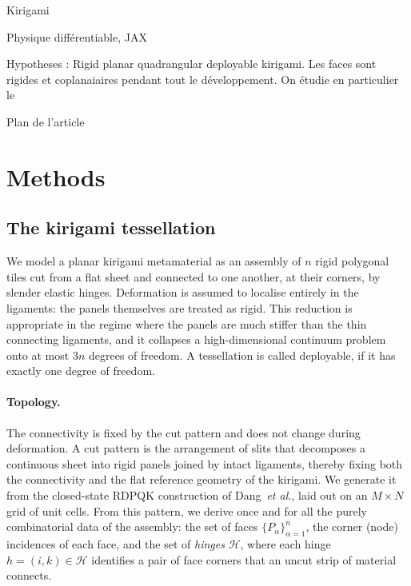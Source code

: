 \documentclass[pdflatex,sn-mathphys-num]{sn-jnl}%
\theoremstyle{thmstyleone}%
\theoremstyle{thmstyletwo}%
\theoremstyle{thmstylethree}%
\begin{document}
Kirigami

Physique différentiable, JAX

Hypotheses : 
Rigid planar quadrangular deployable kirigami. 
Les faces sont rigides et coplanaiaires pendant tout le développement. 
On étudie en particulier le 


Plan de l'article

\section{Methods}\label{secM}

\subsection{The kirigami tessellation}

We model a planar kirigami metamaterial as an assembly of $n$ rigid polygonal tiles cut from a flat sheet and connected to one another, at their corners, by slender elastic hinges. Deformation is assumed to localise entirely in the ligaments: the panels themselves are treated as rigid. This
reduction is appropriate in the regime where the panels are much stiffer than the thin connecting ligaments, and it collapses a high-dimensional continuum problem onto at most $3n$ degrees of freedom. A tessellation is called deployable, if it has exactly one degree of freedom. 

\paragraph{Topology.}
The connectivity is fixed by the cut pattern and does not change during deformation. A cut pattern is the arrangement of slits that decomposes a continuous sheet into rigid panels joined by intact ligaments, thereby fixing both the connectivity and the flat reference geometry of the kirigami. We generate it from the closed-state RDPQK construction of Dang~\emph{et al.}, laid out on an $M \times N$ grid of unit cells. From this pattern, we derive once and for all the purely combinatorial data of the assembly: the set of faces
$\{P_\alpha\}_{\alpha=1}^{n}$, the corner (node) incidences of each face, and the set of \emph{hinges} $\mathcal{H}$, where each hinge $h=(i,k)\in\mathcal{H}$
identifies a pair of face corners that an uncut strip of material connects. 
\end{document}
